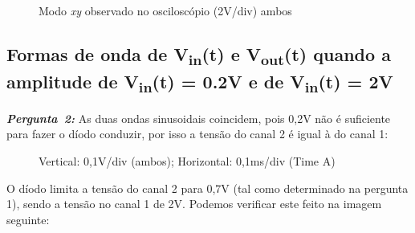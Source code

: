 \documentclass[pdftex,12pt,a4paper]{report}
\begin{document}
\begin{figure}[h]
\centerline{}
\caption{Modo \textit{xy} observado no osciloscópio (2V/div) ambos}\label{grafico_1c_osciloscopio}
\end{figure}

\clearpage
\subsection{Formas de onda de V\textsubscript{in}(t)  e V\textsubscript{out}(t) quando a amplitude de V\textsubscript{in}(t) = 0.2V e de V\textsubscript{in}(t) = 2V}
\hbox{\emph{\textbf{Pergunta 2:}}\newline}
As duas ondas sinusoidais coincidem, pois 0,2V não é suficiente para fazer o díodo conduzir, por isso a tensão do canal 2 é igual à do canal 1:

\begin{figure}[h]
\centerline{}
\caption{Vertical: 0,1V/div (ambos); Horizontal: 0,1ms/div (Time A)}\label{grafico_12_02_osciloscopio}
\end{figure}

O díodo limita a tensão do canal 2 para 0,7V (tal como determinado na pergunta 1), sendo a tensão no canal 1 de 2V. Podemos verificar este feito na imagem seguinte: 
\end{document}

